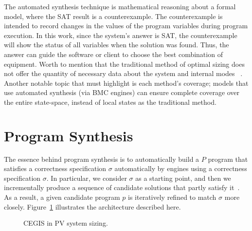 \documentclass[review]{elsarticle}
\begin{document}
The automated synthesis technique is mathematical reasoning about a formal model, where the SAT result is a counterexample. The counterexample is intended to record changes in the values of the program variables during program execution. In this work, since the system's answer is SAT, the counterexample will show the status of all variables when the solution was found. Thus, the answer can guide the software or client to choose the best combination of equipment. Worth to mention that the traditional method of optimal sizing does not offer the quantity of necessary data about the system and internal modes ~\citep{Benatiallah2017,Pradhan,Swarnkar}. Another notable topic that must highlight is each method's coverage; models that use automated synthesis (via BMC engines) can ensure complete coverage over the entire state-space, instead of local states as the traditional method.

\section{Program Synthesis}
\label{sec:Synthesis}

The essence behind program synthesis is to automatically build a $P$ program that satisfies a correctness specification $\sigma$ automatically by engines using a correctness specification $\sigma$. In particular, we consider $\sigma$ as a starting point, and then we incrementally produce a sequence of candidate solutions that partly satisfy it~\citep{Abateetal2017}. As a result, a given candidate program $p$ is iteratively refined to match $\sigma$ more closely. Figure~\ref{Counter-Example-Guided-Inductive-Synthesis} illustrates the architecture described here.

%
\begin{figure}[ht]
\begin{center}
\end{center}
	\caption{CEGIS in PV system sizing.}
	\label{Counter-Example-Guided-Inductive-Synthesis}
\end{figure}
\end{document}
